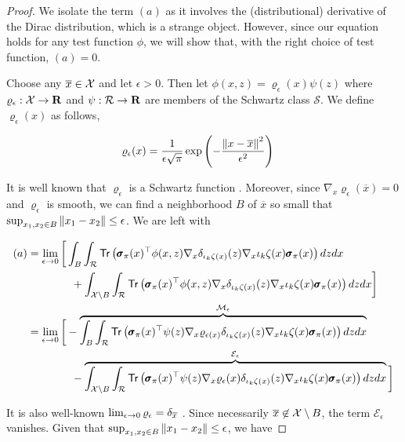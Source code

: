 \begin{proof}
  We isolate the term $(a)$ as it involves the (distributional)
  derivative of the Dirac distribution, which is a strange
  object. However, since our equation holds for any test function
  $\phi$, we will show that, with the right choice of test function,
  $(a) = 0$. 
    
  Choose any $\overline{x}\in\mathcal{X}$ and let $\epsilon>0$. Then let
  $\phi(x, z) = \varrho_\epsilon(x)\psi(z)$ where
  $\varrho_\epsilon:\mathcal{X}\to\mathbf{R}$ and $\psi:\operatorname{\mathcal{R}}\to\mathbf{R}$ are
  members of the Schwartz class $\mathscr{S}$. 
  We define $\varrho_\epsilon(x)$ as follows,
    
  \begin{align*}
    \varrho_\epsilon(x) &= \frac{1}{\epsilon\sqrt{\pi}}\exp\left(-\frac{\left\|x - \overline{x}\right\|^2}{\epsilon^2}\right)
  \end{align*}

  It is well known that $\varrho_\epsilon$ is a Schwartz function
  \citep{lax2002functional}. Moreover, since
  $\nabla_x\varrho_\epsilon(\overline{x}) = 0$ and $\varrho_\epsilon$
  is smooth, we can find a neighborhood $B$ of $\overline{x}$ so small
  that $\sup_{x_1,x_2\in B}\left\|x_1 - x_2\right\|\leq\epsilon$. We are left
  with
    
  \begin{align*}
    (a) &= \lim_{\epsilon\to
          0}\bigg[\int_{B}\int_{\returnspace}\trace\left(\quadraticform{\xxs(x)}{\phi(x,
          z)\nabla_x\dirac{\proj{k}\statistics(x)}(z)\nabla_x\proj{k}\statistics(x)}\right)dzdx\\ 
        &\qquad\qquad+ \int_{\xxX\setminus
          B}\int_{\returnspace}\trace\left(\quadraticform{\xxs(x)}{\phi(x,
          z)\nabla_x\dirac{\proj{k}\statistics(x)}(z)\nabla_x\proj{k}\statistics(x)}\right)dzdx\bigg]\\ 
        &= \lim_{\epsilon\to
          0}\bigg[-\overbrace{\int_{B}\int_{\returnspace}\trace\left(\quadraticform{\xxs(x)}{\psi(z)\nabla_x\varrho_{\epsilon(x)}\dirac{\proj{k}\statistics(x)}(z)\nabla_x\proj{k}\statistics(x)}\right)dzdx}^{\mathcal{M}_\epsilon}\\
        &\qquad\qquad- \overbrace{\int_{\xxX\setminus
          B}\int_{\returnspace}\trace\left(\quadraticform{\xxs(x)}{\psi(z)\nabla_x\varrho_{\epsilon}(x)\dirac{\proj{k}\statistics(x)}(z)\nabla_x\proj{k}\statistics(x)}\right)dzdx}^{\mathcal{E}_\epsilon}\bigg]\\ 
  \end{align*}
    
  It is also well-known $\lim_{\epsilon\to 0}\varrho_\epsilon =
  \delta_{\overline{x}}$ \citep{lax2002functional}. Since necessarily
  $\overline{x}\not\in\mathcal{X}\setminus B$, the term
  $\mathcal{E}_\epsilon$ vanishes. Given that $\sup_{x_1,x_2\in
    B}\left\|x_1-x_2\right\|\leq\epsilon$, we have
    

\end{proof}
